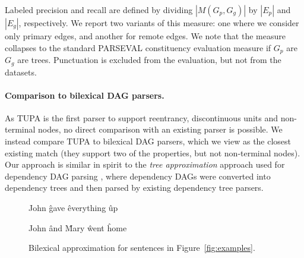 \documentclass[11pt,a4paper]{article}
\newcommand{\parser}[1]{TUPA\textsubscript{#1}}
\newcommand{\figref}[1]{Figure~\ref{#1}}
\begin{document}
\vspace{-.6cm}

Labeled precision and recall are defined by dividing $|M(G_p,G_g)|$ by $|E_p|$ and $|E_g|$, respectively.
We report two variants of this measure: one where we consider only primary edges,
and another for remote edges. We note that the measure collapses to the standard
PARSEVAL constituency evaluation measure if $G_p$ are $G_g$ are trees.
Punctuation is excluded from the evaluation, but not from the datasets.

\paragraph{Comparison to bilexical DAG parsers.}
As \parser{} is the first parser to support reentrancy, discontinuous units and
non-terminal nodes, no direct comparison with an existing parser is possible.
We instead compare \parser{} to bilexical DAG parsers,
which we view as the closest existing match (they support two of the properties,
but not non-terminal nodes).
Our approach is similar in spirit
to the \textit{tree approximation} approach used for dependency DAG parsing
\cite{agic2015semantic,fernandez2015parsing},
where dependency DAGs were converted into dependency trees
and then parsed by existing dependency tree parsers.

\begin{figure}[ht]
\centering
{}
\begin{dependency}[theme = simple]
\begin{deptext}[column sep=.7em,ampersand replacement=\^]
John \^ gave \^ everything \^ up \\
\end{deptext}
\end{dependency}
\begin{dependency}[theme = simple]
\begin{deptext}[column sep=.7em,ampersand replacement=\^]
John \^ and \^ Mary \^ went \^ home \\
\end{deptext}
\end{dependency}
\caption{Bilexical approximation for sentences in \figref{fig:examples}.}
\label{fig:bilexical_example}
\end{figure}
\end{document}
